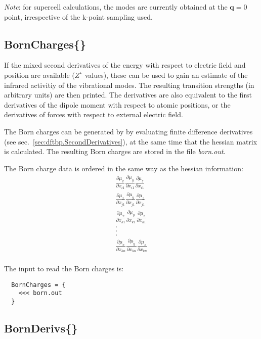 {\em Note}: for supercell calculations, the modes are currently
obtained at the $\mathbf{q}=0$ point, irrespective of the k-point
sampling used.

\subsection{BornCharges\{\}}
\label{sec:modes.BornCharges}

If the mixed second derivatives of the energy with respect to electric
field and position are available ($Z^\star$ values), these can be used
to gain an estimate of the infrared activitiy of the vibrational
modes. The resulting transition strengths (in arbitrary units) are
then printed. The derivatives are also equivalent to the first
derivatives of the dipole moment with respect to atomic positions, or
the derivatives of forces with respect to external electric field.

The Born charges can be generated by \dftbp{} by evaluating finite
difference derivatives (see sec.~\ref{sec:dftbp.SecondDerivatives}),
at the same time that the hessian matrix is calculated. The resulting
Born charges are stored in the file {\it born.out}.

The Born charge data is ordered in the same way as the hessian
information:
\begin{align*}
  \frac{\partial \mu_x}{\partial x_{i1}} \frac{\partial \mu_y}{\partial x_{i1}}
  \frac{\partial \mu_z}{\partial x_{i1}}\\
  \frac{\partial \mu_x}{\partial x_{j1}} \frac{\partial \mu_y}{\partial x_{j1}}
  \frac{\partial \mu_z}{\partial x_{j1}}\\
  \frac{\partial \mu_x}{\partial x_{k1}} \frac{\partial \mu_y}{\partial x_{k1}}
  \frac{\partial \mu_z}{\partial x_{k1}}\\
  .\\
  .\\
  .\\
  \frac{\partial \mu_x}{\partial x_{kn}} \frac{\partial \mu_y}{\partial x_{kn}}
  \frac{\partial \mu_z}{\partial x_{kn}}\\
\end{align*}

The input to read the Born charges is:
\begin{verbatim}
  BornCharges = {
    <<< born.out
  }
\end{verbatim}

\subsection{BornDerivs\{\}}
\label{sec:modes.BornDerivs}

